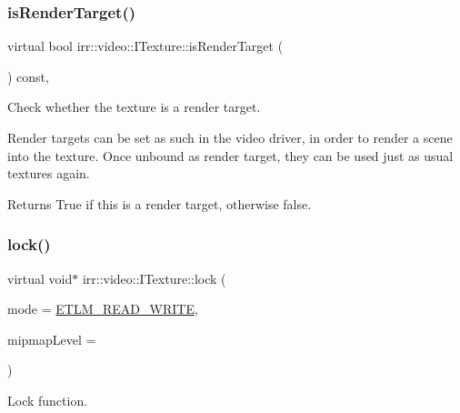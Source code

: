 \subsubsection{\texorpdfstring{is\+Render\+Target()}{isRenderTarget()}}
{\footnotesize\ttfamily virtual bool irr\+::video\+::\+I\+Texture\+::is\+Render\+Target (\begin{DoxyParamCaption}{ }\end{DoxyParamCaption}) const\hspace{0.3cm}{\ttfamily [inline]}, {\ttfamily [virtual]}}



Check whether the texture is a render target. 

Render targets can be set as such in the video driver, in order to render a scene into the texture. Once unbound as render target, they can be used just as usual textures again. \begin{DoxyReturn}{Returns}
True if this is a render target, otherwise false. 
\end{DoxyReturn}
\mbox{\label{classirr_1_1video_1_1ITexture_aa09ee89973a645ebdd2bd61ed859df38}} 
\subsubsection{\texorpdfstring{lock()}{lock()}}
{\footnotesize\ttfamily virtual void$\ast$ irr\+::video\+::\+I\+Texture\+::lock (\begin{DoxyParamCaption}\item[{\hyperlink{namespaceirr_1_1video_a3916d259e8fe0d0d02e8ee0adc8af5bc}{E\+\_\+\+T\+E\+X\+T\+U\+R\+E\+\_\+\+L\+O\+C\+K\+\_\+\+M\+O\+DE}}]{mode = {\ttfamily \hyperlink{namespaceirr_1_1video_a3916d259e8fe0d0d02e8ee0adc8af5bca41973750ecd380c9a17fa575262f5037}{E\+T\+L\+M\+\_\+\+R\+E\+A\+D\+\_\+\+W\+R\+I\+TE}},  }\item[{\hyperlink{namespaceirr_a0416a53257075833e7002efd0a18e804}{u32}}]{mipmap\+Level = {} }\end{DoxyParamCaption})\hspace{0.3cm}{\ttfamily [pure virtual]}}



Lock function. 

